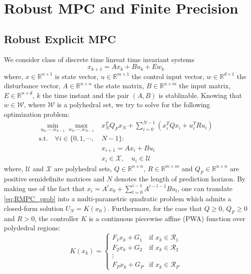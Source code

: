 \section{Robust MPC and Finite Precision}
\subsection{Robust Explicit MPC}
\def\reals{\mathbb{R}}
We consider class of discrete time linreat time invariant systems
\begin{equation}
\label{eq:DSS}
x_{k+1}=Ax_k+Bu_k+Ew_k
\end{equation}
where, $x\in \reals^{n\times 1}$ is state vector, $u\in \reals^{m\times 1}$ the control input vector, $w\in \reals^{d\times 1}$ the disturbance vector, $A\in \reals^{n\times n}$ the state matrix, $B\in \reals^{n\times m}$ the input matrix, $E\in \reals^{n\times d}$, $k$ the time instant and the pair $(A,B)$ is stablizable. Knowing that $w\in\mathcal{W}$, where $\mathcal{W}$ is a polyhedral set, we try to solve for the following optimization problem:
\begin{align}
\label{eq:RMPC_prob}
\min_{u_0,\cdots,u_{N-1}}\max_{w_0,\cdots,w_{N-1}}& x_N^TQ_Fx_N+\sum_{i=0}^{N-1}(x_i^TQx_i+u_i^TRu_i)\nonumber\\
\text{s.t.}\quad\forall i\in\{0,1,\cdots,&N-1\}:\nonumber\\
&x_{i+1}=Ax_i+Bu_i\nonumber\\
&x_i\in\mathcal{X},\quad u_i\in \mathcal{U}	
\end{align}
where, $\mathcal U$ and $\mathcal X$ are polyhedral sets, $Q\in\reals^{n\times n}$, $R\in\reals^{m\times m}$ and $Q_F\in\reals^{n\times n}$ are positive semidefinite matrices and $N$ denotes the length of prediction horizon. By making use of the fact that $x_i=A^ix_0+\sum_{l=0}^{i-1}A^{i-l-1}Bu_l$, one can translate \eqref{eq:RMPC_prob} into a multi-parametric quadratic problem which admits a closed-form solution $U_N=K(x_0)$. Furthermore, for the case that $Q\geq0$, $Q_F\geq0$ and $R>0$, the controller $K$ is a continuous piecewise affine (PWA) function over polydedral regions:
\begin{equation}
K(x_k)=
\begin{cases}
F_1x_k+G_1 & \text{if $x_k\in \mathcal{R}_1$}\\
F_2x_k+G_2 & \text{if $x_k\in \mathcal{R}_2$}\\
\vdots\\
F_Px_k+G_P & \text{if $x_k\in \mathcal{R}_P$}
\end{cases} 
\end{equation}
